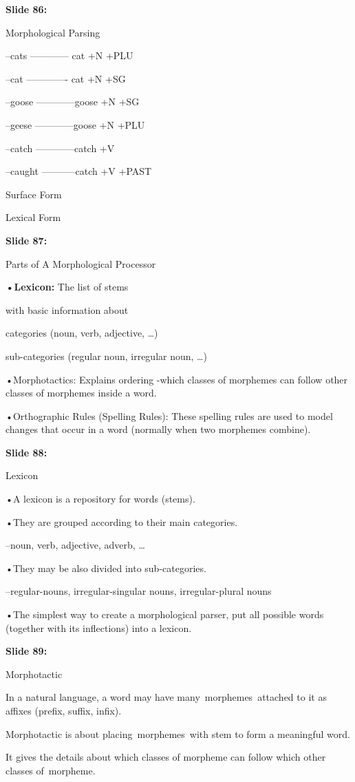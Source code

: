 \documentclass[11pt,a4paper]{article}
\begin{document}
\textbf{Slide 86:}

Morphological Parsing

–cats ------------	cat +N +PLU

–cat -------------	cat +N +SG

–goose ------------goose +N +SG

–geese ------------goose +N +PLU

–catch ------------catch +V

–caught -----------catch +V +PAST

Surface Form

Lexical Form

\textbf{Slide 87:}

Parts of A Morphological Processor

\textbf{•Lexicon:}  The list of stems

with basic information about

categories (noun, verb, adjective, …)

sub-categories (regular noun, irregular noun, …)

•Morphotactics: Explains ordering -which classes of morphemes can follow other classes of morphemes inside a word.

•Orthographic Rules (Spelling Rules): These spelling rules are used to model changes that occur in a word (normally when two morphemes combine).

\textbf{Slide 88:}

Lexicon

•A lexicon is a repository for words (stems).

•They are grouped according to their main categories.

–noun, verb, adjective, adverb, …

•They may be also divided into sub-categories.

–regular-nouns, irregular-singular nouns, irregular-plural nouns

•The simplest way to create a morphological parser, put all possible words (together with its inflections) into a lexicon.

\textbf{Slide 89:}

Morphotactic

In a natural language, a word may have many morphemes attached to it as affixes (prefix, suffix, infix).

Morphotactic is about placing morphemes with stem to form a meaningful word.

It gives the details about which classes of morpheme can follow which other classes of morpheme.
\end{document}
